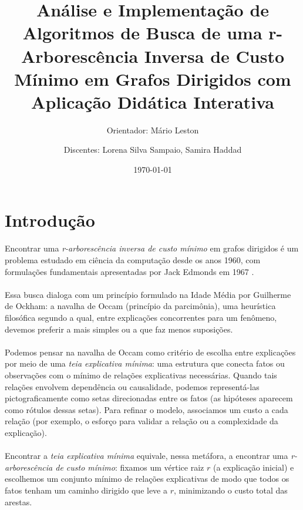 \documentclass[12pt,a4paper]{article}
\title{Análise e Implementação de Algoritmos de Busca de uma r-Arborescência Inversa de Custo Mínimo em Grafos Dirigidos com Aplicação Didática Interativa}
\author{Orientador: Mário Leston 
\and Discentes: Lorena Silva Sampaio, Samira Haddad}
\date{\today}
\begin{document}
\maketitle

\section{Introdução}

\paragraph{}
Encontrar uma \textit{r-arborescência inversa de custo mínimo} em grafos dirigidos é um problema estudado em ciência da computação desde os anos 1960, com formulações fundamentais apresentadas por Jack Edmonds em 1967 \cite{edmonds1967optimum}.

\paragraph{}
Essa busca dialoga com um princípio formulado na Idade Média por Guilherme de Ockham: a navalha de Occam (princípio da parcimônia), uma heurística filosófica segundo a qual, entre explicações concorrentes para um fenômeno, devemos preferir a mais simples ou a que faz menos suposições.

\paragraph{}
Podemos pensar na navalha de Occam como critério de escolha entre explicações por meio de uma \textit{teia explicativa mínima}: uma estrutura que conecta fatos ou observações com o mínimo de relações explicativas necessárias.
Quando tais relações envolvem dependência ou causalidade, podemos representá-las pictograficamente como setas direcionadas entre os fatos (as hipóteses aparecem como rótulos dessas setas).
Para refinar o modelo, associamos um custo a cada relação (por exemplo, o esforço para validar a relação ou a complexidade da explicação).

\paragraph{}
Encontrar a \textit{teia explicativa mínima} equivale, nessa metáfora, a encontrar uma \textit{r-arborescência de custo mínimo}: fixamos um vértice raiz \(r\) (a explicação inicial) e escolhemos um conjunto mínimo de relações explicativas de modo que todos os fatos tenham um caminho dirigido que leve a \(r\), minimizando o custo total das arestas.
\end{document}
